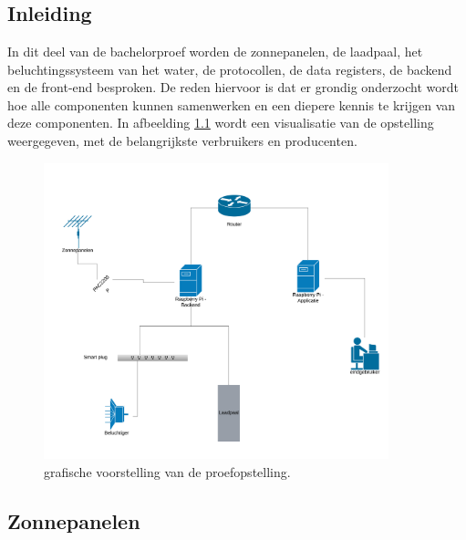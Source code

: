 \chapter{}%
\label{ch:stand-van-zaken}



\section{Inleiding}
\label{sec:stand-van-zaken-inleiding}

In dit deel van de bachelorproef worden de zonnepanelen, de laadpaal, het beluchtingssysteem van het water, de protocollen, de data registers, de backend en de front-end besproken. De reden hiervoor is dat er grondig onderzocht wordt hoe alle componenten kunnen samenwerken en een diepere kennis te krijgen van deze componenten. In afbeelding \ref{fig:Netwedrkdiagram-Opstelling} wordt een visualisatie van de opstelling weergegeven, met de belangrijkste verbruikers en producenten.

\begin{figure}[h]
    \includegraphics[width=10cm]{./graphics/Netwerkdiagram-Opstelling.png}
    \caption{grafische voorstelling van de proefopstelling.}
    \label{fig:Netwedrkdiagram-Opstelling}
\end{figure}

\section{Zonnepanelen}
\label{sec:stand-van-zaken-zonnepanelen}

